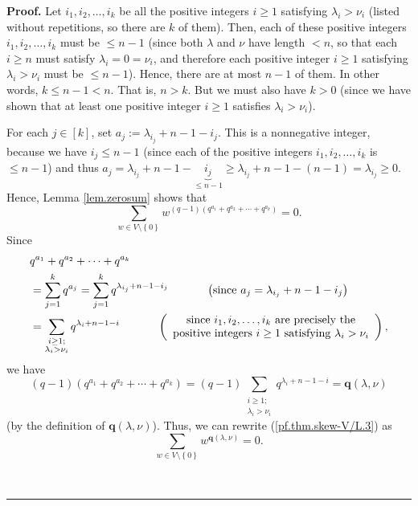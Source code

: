 \documentclass[numbers=enddot,12pt,final,onecolumn,notitlepage]{scrartcl}%
\numberwithin{exer}{section}
\theoremstyle{definition}
\newenvironment{proof}[1][Proof]{\noindent\textbf{#1.} }{\ \rule{0.5em}{0.5em}}
\let\sumnonlimits\sum
\renewcommand{\sum}{\sumnonlimits\limits}
\theoremstyle{plainsl}
\begin{document}
\begin{proof}
Let $i_{1},i_{2},\ldots,i_{k}$ be all the positive integers $i\geq1$
satisfying $\lambda_{i}>\nu_{i}$ (listed without repetitions, so there are $k$
of them). Then, each of these positive integers $i_{1},i_{2},\ldots,i_{k}$
must be $\leq n-1$ (since both $\lambda$ and $\nu$ have length $<n$, so that
each $i\geq n$ must satisfy $\lambda_{i}=0=\nu_{i}$, and therefore each
positive integer $i\geq1$ satisfying $\lambda_{i}>\nu_{i}$ must be $\leq
n-1$). Hence, there are at most $n-1$ of them. In other words, $k\leq n-1<n$.
That is, $n>k$. But we must also have $k>0$ (since we have shown that at least
one positive integer $i\geq1$ satisfies $\lambda_{i}>\nu_{i}$).

For each $j\in\left[  k\right]  $, set $a_{j}:=\lambda_{i_{j}}+n-1-i_{j}$.
This is a nonnegative integer, because we have $i_{j}\leq n-1$ (since each of
the positive integers $i_{1},i_{2},\ldots,i_{k}$ is $\leq n-1$) and thus
$a_{j}=\lambda_{i_{j}}+n-1-\underbrace{i_{j}}_{\leq n-1}\geq\lambda_{i_{j}%
}+n-1-\left(  n-1\right)  =\lambda_{i_{j}}\geq0$. Hence, Lemma
\ref{lem.zerosum} shows that%
\begin{equation}
\sum_{w\in V\setminus\left\{  0\right\}  }w^{\left(  q-1\right)  \left(
q^{a_{1}}+q^{a_{2}}+\cdots+q^{a_{k}}\right)  }=0. \label{pf.thm.skew-V/L.3}%
\end{equation}
Since
\begin{align*}
&  q^{a_{1}}+q^{a_{2}}+\cdots+q^{a_{k}}\\
&  =\sum_{j=1}^{k}q^{a_{j}}=\sum_{j=1}^{k}q^{\lambda_{i_{j}}+n-1-i_{j}%
}\ \ \ \ \ \ \ \ \ \ \left(  \text{since }a_{j}=\lambda_{i_{j}}+n-1-i_{j}%
\right) \\
&  =\sum_{\substack{i\geq1;\\\lambda_{i}>\nu_{i}}}q^{\lambda_{i}%
+n-1-i}\ \ \ \ \ \ \ \ \ \ \left(
\begin{array}
[c]{c}%
\text{since }i_{1},i_{2},\ldots,i_{k}\text{ are precisely the}\\
\text{positive integers }i\geq1\text{ satisfying }\lambda_{i}>\nu_{i}%
\end{array}
\right)  ,
\end{align*}
we have%
\[
\left(  q-1\right)  \left(  q^{a_{1}}+q^{a_{2}}+\cdots+q^{a_{k}}\right)
=\left(  q-1\right)  \sum_{\substack{i\geq1;\\\lambda_{i}>\nu_{i}}%
}q^{\lambda_{i}+n-1-i}=\mathbf{q}\left(  \lambda,\nu\right)
\]
(by the definition of $\mathbf{q}\left(  \lambda,\nu\right)  $). Thus, we can
rewrite (\ref{pf.thm.skew-V/L.3}) as%
\begin{equation}
\sum_{w\in V\setminus\left\{  0\right\}  }w^{\mathbf{q}\left(  \lambda
,\nu\right)  }=0. \label{pf.thm.7.25.7}%
\end{equation}



\end{proof}
\end{document}
